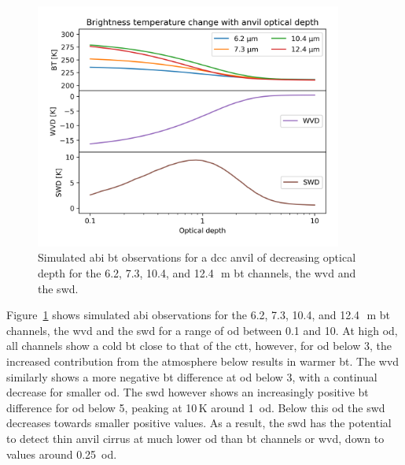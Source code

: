 \begin{figure}[tp]
    \includegraphics[width=0.9\textwidth]{figures/chapter1_09.png}
    \caption[
    Simulated \acrshort{abi} \acrshort{bt} observations for a \acrshort{dcc} anvil of decreasing optical depth
    ]{
    Simulated \acrshort{abi} \acrshort{bt} observations for a \acrshort{dcc} anvil of decreasing optical depth for the 6.2, 7.3, 10.4, and 12.4\,\unit{\mu m} \acrshort{bt} channels, the \acrshort{wvd} and the \acrshort{swd}.
    }
    \label{fig:optical_depth_channels}
\end{figure}

Figure~\ref{fig:optical_depth_channels} shows simulated \acrshort{abi} observations for the 6.2, 7.3, 10.4, and 12.4\,\unit{\mu m} \acrshort{bt} channels, the \acrshort{wvd} and the \acrshort{swd} for a range of \acrshort{od} between 0.1 and 10.
At high \acrshort{od}, all channels show a cold \acrshort{bt} close to that of the \acrshort{ctt}, however, for \acrshort{od} below 3, the increased contribution from the atmosphere below results in warmer \acrshort{bt}.
The \acrshort{wvd} similarly shows a more negative \acrshort{bt} difference at \acrshort{od} below 3, with a continual decrease for smaller \acrshort{od}.
The \acrshort{swd} however shows an increasingly positive \acrshort{bt} difference for \acrshort{od} below 5, peaking at 10\,\unit{K} around 1~\acrshort{od}.
Below this \acrshort{od} the \acrshort{swd} decreases towards smaller positive values.
As a result, the \acrshort{swd} has the potential to detect thin anvil cirrus at much lower \acrshort{od} than \acrshort{bt} channels or \acrshort{wvd}, down to values around 0.25~\acrfull{od}.

